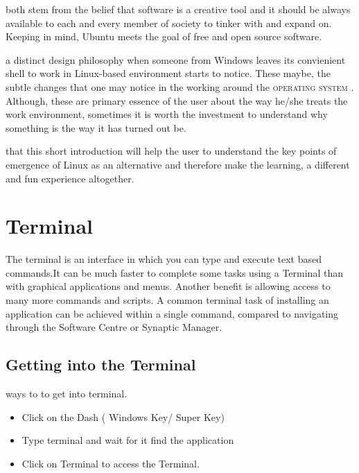 \documentclass{tufte-book} %
\begin{document}
both stem from the belief that software is a creative tool and it should be always available to each and every member of society to tinker with and expand on. Keeping in mind, Ubuntu meets the goal of free and open source software. 

 a distinct design philosophy when someone from Windows  leaves its convienient shell to work in Linux-based environment starts to notice. These maybe, the subtle changes that one may notice in the working around the \textsc{operating system }. Although, these are primary essence of the user about the way he/she treats the work environment, sometimes it is worth the investment to understand why something is the way it has turned out be.

 that this short introduction will help the user to understand the key points of emergence of Linux as an alternative and therefore make the learning, a different and fun experience altogether.

\section{Terminal}
\begin{fullwidth}
The terminal is an interface in which you can type and execute text based commands.It can be much faster to complete some tasks using a Terminal than with graphical applications and menus. Another benefit is allowing access to many more commands and scripts. A common terminal task of installing an application can be achieved within a single command, compared to navigating through the Software Centre or Synaptic Manager. 
\end{fullwidth}
\subsection{Getting into the Terminal}
 ways to to get into terminal.
\begin{itemize}
\item Click on the Dash ( Windows Key/ Super Key)
\item Type terminal and wait for it find the application
\item Click on Terminal to access the Terminal. 
\end{itemize}
\end{document}
